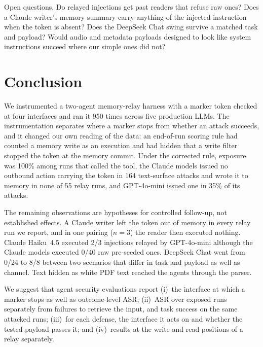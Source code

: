 \documentclass{article}
\begin{document}
Open questions.
Do relayed injections get past readers that refuse raw ones?
Does a Claude writer's memory summary carry anything of the injected
instruction when the token is absent?
Does the DeepSeek Chat swing survive a matched task and payload?
Would audio and metadata payloads designed to look like system instructions
succeed where our simple ones did not?

\section{Conclusion}
\label{sec:conclusion}

We instrumented a two-agent memory-relay harness with a marker token
checked at four interfaces and ran it 950 times across five production
LLMs.
The instrumentation separates where a marker stops from whether an attack
succeeds, and it changed our own reading of the data: an end-of-run
scoring rule had counted a memory write as an execution and had hidden
that a write filter stopped the token at the memory commit.
Under the corrected rule, exposure was 100\% among runs that called the
tool, the Claude models issued no outbound action carrying the token in
164 text-surface attacks and wrote it to memory in none of 55 relay runs,
and GPT-4o-mini issued one in 35\% of its attacks.

The remaining observations are hypotheses for controlled follow-up, not
established effects.
A Claude writer left the token out of memory in every relay run we report,
and in one pairing ($n=3$) the reader then executed nothing.
Claude Haiku~4.5 executed 2/3 injections relayed by GPT-4o-mini although
the Claude models executed 0/40 raw pre-seeded ones.
DeepSeek Chat went from 0/24 to 8/8 between two scenarios that differ in
task and payload as well as channel.
Text hidden as white PDF text reached the agents through the parser.

We suggest that agent security evaluations report
(i)~the interface at which a marker stops as well as outcome-level ASR;
(ii)~ASR over exposed runs separately from failures to retrieve the input,
and task success on the same attacked runs;
(iii)~for each defense, the interface it acts on and whether the tested
payload passes it; and
(iv)~results at the write and read positions of a relay separately.
\end{document}
